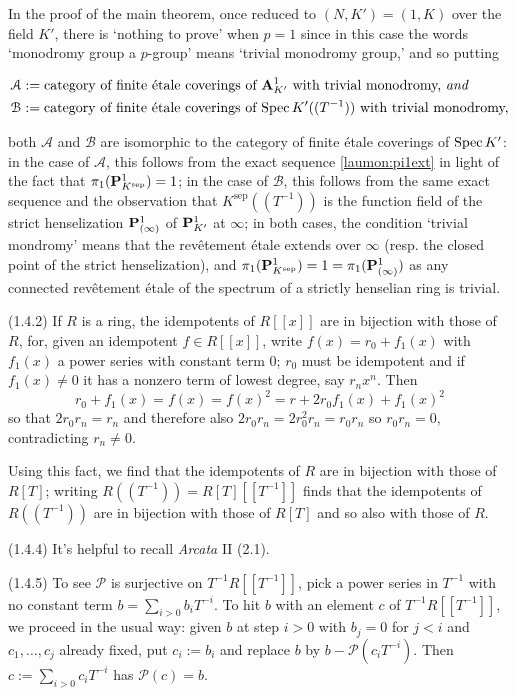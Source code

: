 \documentclass[deligne.tex]{subfiles}
\begin{document}
In the proof of the main theorem, once reduced to $(N,K')=(1,K)$ over the
field $K'$, there is `nothing to prove' when $p=1$ since in this case the
words `monodromy group a $p$-group' means `trivial monodromy group,' and
so putting
\begin{ceqn}\begin{align*}
&\mathcal A := \text{category of finite étale coverings of $\mathbf{A}^1_{K'}$ 
with trivial monodromy, \emph{and}} \\
&\mathcal B := \text{category of finite étale coverings of
$\operatorname{Spec} K'((T^{-1}))$ with trivial monodromy,}
\end{align*}\end{ceqn}
both $\mathcal A$ and $\mathcal B$ are isomorphic to the category of
finite étale coverings of $\operatorname{Spec} K'$: in the case of $\mathcal A$, this 
follows from the exact sequence \eqref{laumon:pi1ext} in light of the fact 
that $\pi_1(\mathbf{P}^1_{K^{\mathrm{sep}}})=1$;
in the case of $\mathcal B$, this follows from the same exact sequence and
the observation that $K^{\mathrm{sep}}((T^{-1}))$ is the function field of
the strict henselization $\mathbf{P}^1_{(\infty)}$ of $\mathbf{P}^1_{K'}$ at $\infty$; in
both cases, the condition `trivial mondromy' means that the revêtement
étale extends over $\infty$
(resp. the closed point of the strict henselization), and
$\pi_1(\mathbf{P}^1_{K^{\mathrm{sep}}})=1=\pi_1(\mathbf{P}^1_{(\infty)})$ as any
connected revêtement étale of the spectrum of a strictly henselian ring is 
trivial.

(1.4.2) If $R$ is a ring, the idempotents of $R[[x]]$ are in bijection with
those of $R$, for, given an idempotent $f\in R[[x]]$, write 
$f(x)=r_0+f_1(x)$ with $f_1(x)$ a power series with constant term 0;
$r_0$ must be idempotent and if $f_1(x)\ne0$ it has a nonzero term of
lowest degree, say $r_nx^n$. Then
\begin{equation*}
	r_0+f_1(x)=f(x)=f(x)^2=r+2r_0f_1(x)+f_1(x)^2
\end{equation*}
so that $2r_0r_n=r_n$ and therefore also $2r_0r_n=2r_0^2r_n=r_0r_n$ so
$r_0r_n=0$, contradicting $r_n\ne0$.

Using this fact, we find that the idempotents of $R$ are in bijection with
those of $R[T]$; writing $R((T^{-1}))=R[T][[T^{-1}]]$ finds that the 
idempotents of $R((T^{-1}))$ are in bijection with those of $R[T]$ and so
also with those of $R$.

(1.4.4) It's helpful to recall \emph{Arcata} II (2.1).

(1.4.5) To see $\mathscr P$ is surjective on $T^{-1}R[[T^{-1}]]$, pick a
power series in $T^{-1}$ with no constant term $b=\sum_{i>0}b_iT^{-i}$.
To hit $b$ with an element $c$ of $T^{-1}R[[T^{-1}]]$, we proceed in the
usual way: given $b$ at step $i>0$ with $b_j=0$ for $j<i$ and 
$c_1,\ldots,c_j$ already fixed, put $c_i:=b_i$ and replace $b$ by
$b-\mathscr P(c_iT^{-i})$. Then $c:=\sum_{i>0}c_iT^{-i}$ has
$\mathscr P(c)=b$.
\end{document}
